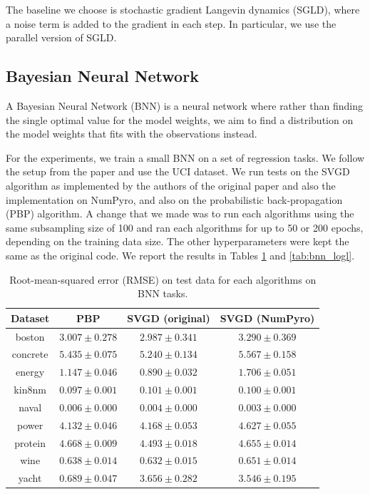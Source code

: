 The baseline we choose is stochastic gradient Langevin dynamics (SGLD), where a noise term is added to the gradient in each step. In particular, we use the parallel version of SGLD. 






\subsection{Bayesian Neural Network}

A Bayesian Neural Network (BNN) is a neural network where rather than finding the single optimal value for the model weights, we aim to find a distribution on the model weights that fits with the observations instead.

For the experiments, we train a small BNN on a set of regression tasks. We follow the setup from the paper and use the UCI dataset. We run tests on the SVGD algorithm as implemented by the authors of the original paper and also the implementation on NumPyro, and also on the probabilistic back-propagation (PBP) algorithm. A change that we made was to run each algorithms using the same subsampling size of 100 and ran each algorithms for up to 50 or 200 epochs, depending on the training data size. The other hyperparameters were kept the same as the original code. We report the results in Tables \ref{tab:bnn_rmse} and \ref{tab:bnn_logl}. 

\begin{table}[]
\centering
\caption{Root-mean-squared error (RMSE) on test data for each algorithms on BNN tasks.} 
\label{tab:bnn_rmse}
\begin{tabular}{|c|ccc|}
\hline
 Dataset & PBP & SVGD (original) & SVGD (NumPyro)  \\
 \hline
boston & $3.007 \pm 0.278$ & $2.987 \pm 0.341$ & $3.290 \pm 0.369$ \\
concrete & $5.435 \pm 0.075$ & $5.240 \pm 0.134$ & $5.567 \pm 0.158$ \\
energy & $1.147 \pm 0.046$ & $0.890 \pm 0.032$ & $1.706 \pm 0.051$ \\
kin8nm & $0.097 \pm 0.001$ & $0.101 \pm 0.001$ & $0.100 \pm 0.001$ \\
naval & $0.006 \pm 0.000$ & $0.004 \pm 0.000$ & $0.003 \pm 0.000$ \\
power & $4.132 \pm 0.046$ & $4.168 \pm 0.053$ & $4.627 \pm 0.055$ \\
protein & $4.668 \pm 0.009$ & $4.493 \pm 0.018$ & $4.655 \pm 0.014$ \\
wine & $0.638 \pm 0.014$ & $0.632 \pm 0.015$ & $0.651 \pm 0.014$ \\
yacht & $0.689 \pm 0.047$ & $3.656 \pm 0.282$ & $3.546 \pm 0.195$ \\
\hline
\end{tabular}
\end{table}

